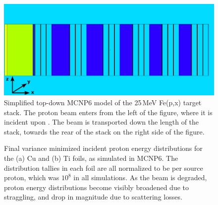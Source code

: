 \begin{figure}
 \centering
 \includegraphics[trim = 0mm 0mm 2mm 0mm, clip,width=0.75\columnwidth]{./figures/ipf_stack_nolabels_axes.PNG}
\caption{ Simplified top-down MCNP6 model of the 25\,MeV  Fe(p,x) target stack. The  proton beam enters from the left of the figure, where it is incident upon . The beam is transported down the length of the stack, towards the rear of the stack on the right side of the figure.
}
 \label{fig:fe_vised_25}
\end{figure}





\begin{figure}
    \centering    
    \caption{ Final variance minimized incident proton energy distributions for the (a) Cu and (b) Ti foils, as simulated in MCNP6. The distribution tallies in each foil are all normalized to be per source proton, which was $10^8$ in all simulations. As the beam is degraded, proton energy distributions become visibly broadened due to straggling, and drop in magnitude due to scattering losses.}
     \label{fig:fe_ptallies_appendix}
\end{figure}



